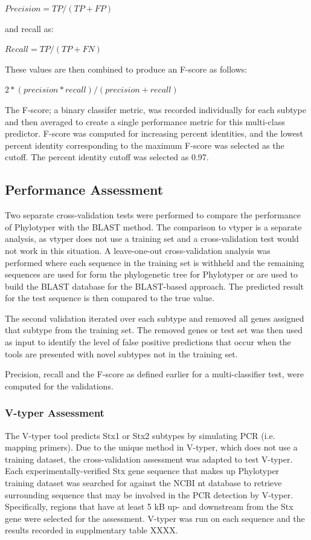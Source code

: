 \documentclass[11pt,letterpaper]{article}
\begin{document}
$Precision = TP / (TP + FP)$

and recall as:

$Recall = TP / (TP + FN)$

These values are then combined to produce an F-score as follows:

$2 * ( precision * recall ) / ( precision + recall )$

The F-score; a binary classifer metric, was recorded individually for each subtype and then averaged to create a single performance metric for this multi-class predictor.  F-score was computed for increasing percent identities, and the lowest percent identity corresponding to the maximum F-score was selected as the cutoff. The percent identity cutoff was selected as 0.97.

\subsection{Performance Assessment}

Two separate cross-validation tests were performed to compare the performance of Phylotyper with the BLAST method. The comparison to vtyper is a separate analysis, as vtyper does not use a training set and a cross-validation test would not work in this situation. A leave-one-out cross-validation analysis was performed where each sequence in the training set is withheld and the remaining sequences are used for form the phylogenetic tree for Phylotyper or are used to build the BLAST database for the BLAST-based approach. The predicted result for the test sequence is then compared to the true value.

The second validation iterated over each subtype and removed all genes assigned that subtype from the training set. The removed genes or test set was then used as input to identify the level of false positive predictions that occur when the tools are presented with novel subtypes not in the training set.

Precision, recall and the F-score as defined earlier for a multi-classifier test, were computed for the validations.

\subsubsection{V-typer Assessment}

The V-typer tool predicts Stx1 or Stx2 subtypes by simulating PCR (i.e. mapping primers). Due to the unique method in V-typer,  which does not use a training dataset, the cross-validation assessment was adapted to test V-typer. Each experimentally-verified Stx gene sequence that makes up Phylotyper training dataset was searched for against the NCBI nt database to retrieve surrounding sequence that may be involved in the PCR detection by V-typer.  Specifically, regions that have at least 5 kB up- and downstream from the Stx gene were selected for the assessment. V-typer was run on each sequence and the results recorded in supplmentary table XXXX.
\end{document}
